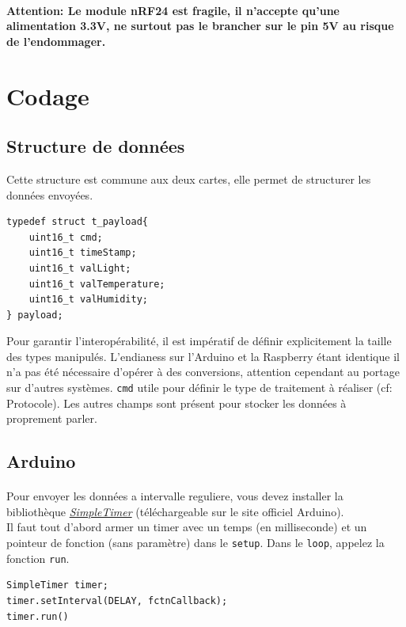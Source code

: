 \documentclass[a4paper, titlepage, oneside, 12pt]{article}%
\begin{document}
\paragraph{}
\textbf{Attention: Le module nRF24 est fragile, il n'accepte qu'une alimentation 3.3V, ne surtout pas le brancher sur le pin 5V au risque de l'endommager.}

\section{Codage}
\subsection{Structure de données}
Cette structure est commune aux deux cartes, elle permet de structurer les données envoyées.
\begin{lstlisting}
typedef struct t_payload{
	uint16_t cmd;
	uint16_t timeStamp;
	uint16_t valLight;
	uint16_t valTemperature;
	uint16_t valHumidity;
} payload;
\end{lstlisting}
Pour garantir l’interopérabilité, il est impératif de définir explicitement la taille des types manipulés.  
L'endianess sur l'Arduino et la Raspberry étant identique il n'a pas été nécessaire d'opérer à des conversions, attention cependant au portage sur d'autres systèmes.
\texttt{cmd} utile pour définir le type de traitement à réaliser (cf: Protocole).
Les autres champs sont présent pour stocker les données à proprement parler.
\subsection{Arduino}
\paragraph{}
Pour envoyer les données a intervalle reguliere, vous devez installer la bibliothèque \href{http://playground.arduino.cc/Code/SimpleTimer?ref=driverlayer.com/web}{\textit{SimpleTimer}} (téléchargeable sur le site officiel Arduino).\\
Il faut tout d'abord armer un timer avec un temps (en milliseconde) et un pointeur de fonction (sans paramètre) dans le \texttt{setup}. Dans le \texttt{loop}, appelez la fonction \texttt{run}.\\
\begin{lstlisting}
SimpleTimer timer;
timer.setInterval(DELAY, fctnCallback);
timer.run()
\end{lstlisting}
\end{document}
